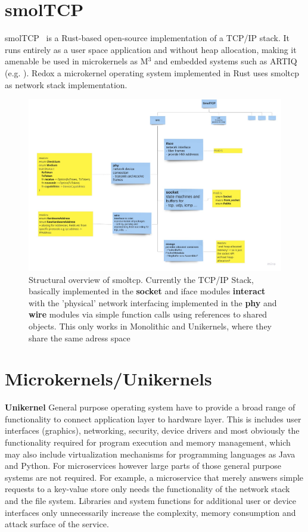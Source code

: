 \section{smolTCP}
smolTCP~\cite{smolTCP} is a Rust-based open-source implementation of a TCP/IP stack. It runs entirely as a user space application and without heap allocation, making it amenable be used in microkernels as M$^3$\cite{Asmussen:M3v} and embedded systems such as ARTIQ (e.g. \cite{lam2021combining}). Redox\cite{redoxwebsite} a microkernel operating system implemented in Rust uses smoltcp as network stack implementation.

\begin{figure}[H]
    \centering
    \includegraphics[scale= 0.33]{figures/SmolTCP - Overview.jpg}
    \caption{Structural overview of smoltcp. Currently the TCP/IP Stack, basically implemented in the \textbf{socket} and iface modules \textbf{interact} with the 'physical' network interfacing implemented in the \textbf{phy} and \textbf{wire} modules via simple function calls using references to shared objects. This only works in Monolithic and Unikernels, where they share the same adress space}
    \label{fig:smoltcp_components}
\end{figure}




\section{Microkernels/Unikernels}

\textbf{Unikernel}
General purpose operating system have to provide a broad range of functionality to connect application layer to hardware layer. This is includes user interfaces (graphics), networking, security, device drivers and most obviously the functionality required for program execution and memory management, which may also include virtualization mechanisms for programming languages as Java and Python. For microservices however large parts of those general purpose systems are not required. For example, a microservice that merely answers simple requests to a key-value store only needs the functionality of the network stack and the file system. Libraries and system functions for additional user or device interfaces only unnecessarily increase the complexity, memory consumption and attack surface of the service.\\

